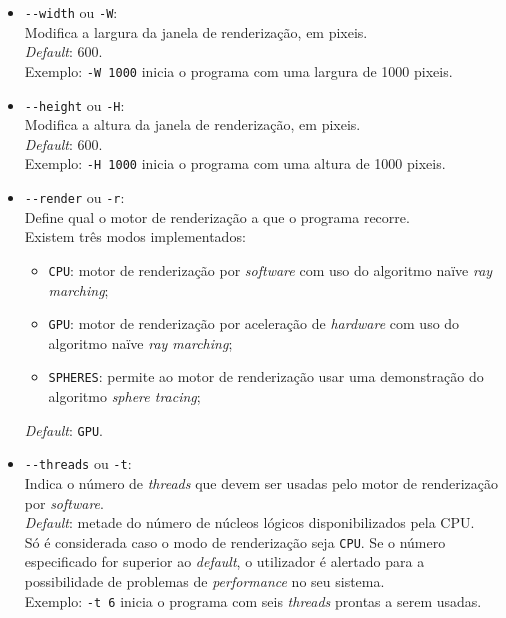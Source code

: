 \begin{itemize}
    \item \verb|--width| ou \verb|-W|:\\
    Modifica a largura da janela de renderização, em pixeis.\\
    \textit{Default}: 600.\\
    Exemplo: \verb|-W 1000| inicia o programa com uma largura de 1000 pixeis.
    
    \item \verb|--height| ou \verb|-H|:\\
    Modifica a altura da janela de renderização, em pixeis.\\
    \textit{Default}: 600.\\
    Exemplo: \verb|-H 1000| inicia o programa com uma altura de 1000 pixeis.

    \item \verb|--render| ou \verb|-r|:\\
    Define qual o motor de renderização a que o programa recorre.\\
    Existem três modos implementados:
    \begin{itemize}[nosep]
        \item \verb|CPU|: motor de renderização por \textit{software} com uso do algoritmo naïve \textit{ray marching};
        \item \verb|GPU|: motor de renderização por aceleração de \textit{hardware} com uso do algoritmo naïve \textit{ray marching};
        \item \verb|SPHERES|: permite ao motor de renderização usar uma demonstração do algoritmo \textit{sphere tracing};
    \end{itemize}
	\textit{Default}: \verb|GPU|.
    
    \item \verb|--threads| ou \verb|-t|:\\
    Indica o número de \textit{threads} que devem ser usadas pelo motor de renderização por \textit{software}.\\
    \textit{Default}: metade do número de núcleos lógicos disponibilizados pela \ac{CPU}.\\
    Só é considerada caso o modo de renderização seja \verb|CPU|. Se o número especificado for superior ao \textit{default}, o utilizador é alertado para a possibilidade de problemas de \textit{performance} no seu sistema.\\
    Exemplo: \verb|-t 6| inicia o programa com seis \textit{threads} prontas a serem usadas.
\end{itemize}

